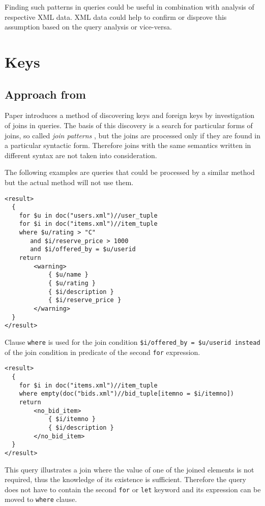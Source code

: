 Finding such patterns in queries could be useful in combination with analysis of respective XML data. XML data could help to confirm or disprove this assumption based on the query analysis or vice-versa.

\section{Keys}

\subsection{Approach from \cite{Necasky:2009:DXK:1529282.1529414}}
Paper \cite{Necasky:2009:DXK:1529282.1529414} introduces a method of discovering keys and foreign keys by investigation of joins in queries. The basis of this discovery is a search for particular forms of joins, so called \emph{join patterns} , but the joins are processed only if they are found in a particular syntactic form. Therefore joins with the same semantics written in different syntax are not taken into consideration.

The following examples are queries that could be processed by a similar method but the actual method will not use them.

\begin{verbatim}
<result>
  {
    for $u in doc("users.xml")//user_tuple
    for $i in doc("items.xml")//item_tuple
    where $u/rating > "C" 
       and $i/reserve_price > 1000 
       and $i/offered_by = $u/userid
    return
        <warning>
            { $u/name }
            { $u/rating }
            { $i/description }
            { $i/reserve_price }
        </warning>
  }
</result>
\end{verbatim}

Clause \texttt{where} is used for the join condition \texttt{\$i/offered\_by = \$u/userid instead} of the join condition in predicate of the second \texttt{for} expression.

\begin{verbatim}
<result>
  {
    for $i in doc("items.xml")//item_tuple
    where empty(doc("bids.xml")//bid_tuple[itemno = $i/itemno])
    return
        <no_bid_item>
            { $i/itemno }
            { $i/description }
        </no_bid_item>
  }
</result>
\end{verbatim}

This query illustrates a join where the value of one of the joined elements is not required, thus the knowledge of its existence is sufficient. Therefore the query does not have to contain the second \texttt{for} or \texttt{let} keyword and its expression can be moved to \texttt{where} clause.

